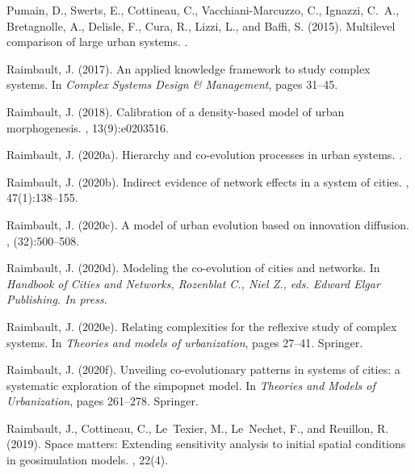 \documentclass[10pt,letterpaper]{article}
\begin{document}
\begin{thebibliography}{}
Pumain, D., Swerts, E., Cottineau, C., Vacchiani-Marcuzzo, C., Ignazzi, C.~A.,
  Bretagnolle, A., Delisle, F., Cura, R., Lizzi, L., and Baffi, S. (2015).
\newblock Multilevel comparison of large urban systems.
.

Raimbault, J. (2017).
\newblock An applied knowledge framework to study complex systems.
\newblock In {\em Complex Systems Design \& Management}, pages 31--45.

Raimbault, J. (2018).
\newblock Calibration of a density-based model of urban morphogenesis.
, 13(9):e0203516.

Raimbault, J. (2020a).
\newblock Hierarchy and co-evolution processes in urban systems.
.

Raimbault, J. (2020b).
\newblock Indirect evidence of network effects in a system of cities.
,
  47(1):138--155.

Raimbault, J. (2020c).
\newblock A model of urban evolution based on innovation diffusion.
, (32):500--508.

Raimbault, J. (2020d).
\newblock Modeling the co-evolution of cities and networks.
\newblock In {\em Handbook of Cities and Networks, Rozenblat C., Niel Z., eds.
  Edward Elgar Publishing. In press}.

Raimbault, J. (2020e).
\newblock Relating complexities for the reflexive study of complex systems.
\newblock In {\em Theories and models of urbanization}, pages 27--41. Springer.

Raimbault, J. (2020f).
\newblock Unveiling co-evolutionary patterns in systems of cities: a systematic
  exploration of the simpopnet model.
\newblock In {\em Theories and Models of Urbanization}, pages 261--278.
  Springer.

Raimbault, J., Cottineau, C., Le~Texier, M., Le~Nechet, F., and Reuillon, R.
  (2019).
\newblock Space matters: Extending sensitivity analysis to initial spatial
  conditions in geosimulation models.
, 22(4).


\end{thebibliography}
\end{document}
